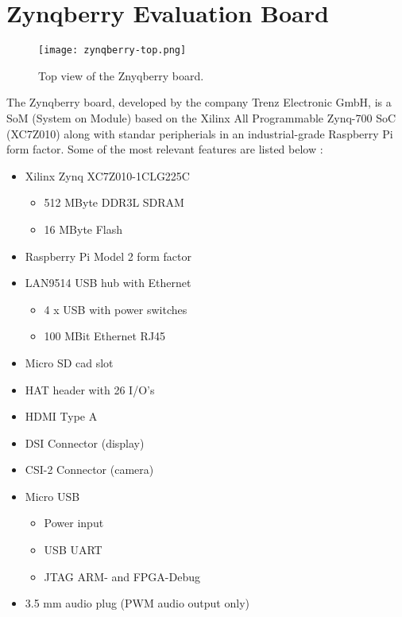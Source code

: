 
\chapter{Zynqberry Evaluation Board}

\begin{figure}
	\centering
	\texttt{[image: zynqberry-top.png]}
	\caption{Top view of the Znyqberry board.} \label{fig:znyqtop}
\end{figure}

The Zynqberry board, developed by the company Trenz Electronic GmbH, is a SoM (System on Module) based on the Xilinx All Programmable Zynq-700 SoC (XC7Z010) along with standar peripherials in an industrial-grade Raspberry Pi form factor. Some of the most relevant features are listed below \cite{zynq-main}:

\begin{itemize}
	\item Xilinx Zynq XC7Z010-1CLG225C
	\begin{itemize}
		\item 512 MByte DDR3L SDRAM
		\item 16 MByte Flash
	\end{itemize}
	\item Raspberry Pi Model 2 form factor
	\item LAN9514 USB hub with Ethernet
	\begin{itemize}
		\item 4 x USB with power switches
		\item 100 MBit Ethernet RJ45
	\end{itemize}
	\item Micro SD cad slot
	\item HAT header with 26 I/O's
	\item HDMI Type A
	\item DSI Connector (display)
	\item CSI-2 Connector (camera)
	\item Micro USB
	\begin{itemize}
		\item Power input
		\item USB UART
		\item JTAG ARM- and FPGA-Debug
	\end{itemize}
	\item 3.5 mm audio plug (PWM audio output only)
\end{itemize}

